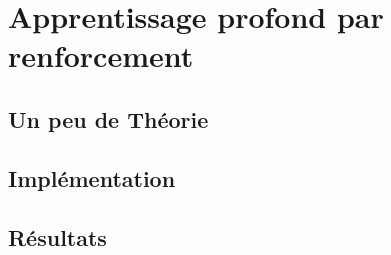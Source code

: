 \section{Apprentissage profond par renforcement}

\subsection{Un peu de Théorie}

\subsection{Implémentation}

\subsection{Résultats}